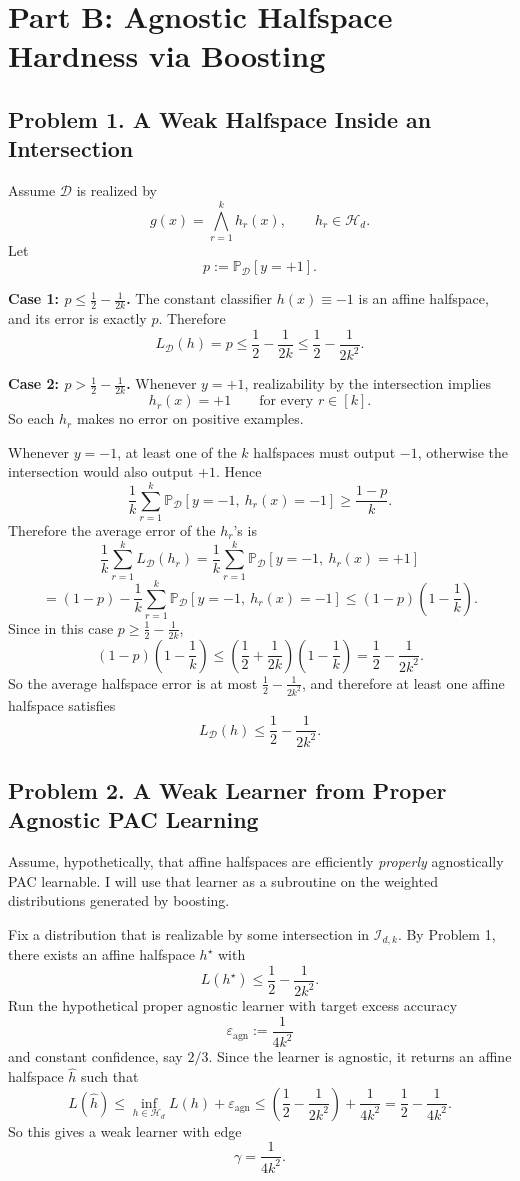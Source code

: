 \documentclass{article}
\newcommand{\PP}{\mathbb{P}}
\newcommand{\cD}{\mathcal{D}}
\newcommand{\cH}{\mathcal{H}}
\newcommand{\cI}{\mathcal{I}}
\begin{document}
\newpage
\section{Part B: Agnostic Halfspace Hardness via Boosting}

\subsection{Problem 1. A Weak Halfspace Inside an Intersection}

Assume $\cD$ is realized by
$$
g(x)=\bigwedge_{r=1}^k h_r(x),
\qquad
h_r\in \cH_d.
$$
Let
$$
p := \PP_{\cD}[y=+1].
$$

\textbf{Case 1: $p \le \frac12-\frac{1}{2k}$.}
The constant classifier $h(x)\equiv -1$ is an affine halfspace, and its error is exactly $p$. Therefore
$$
L_{\cD}(h)=p \le \frac12-\frac{1}{2k} \le \frac12-\frac{1}{2k^2}.
$$

\textbf{Case 2: $p > \frac12-\frac{1}{2k}$.}
Whenever $y=+1$, realizability by the intersection implies
$$
h_r(x)=+1
\qquad
\text{for every }r\in[k].
$$
So each $h_r$ makes no error on positive examples.

Whenever $y=-1$, at least one of the $k$ halfspaces must output $-1$, otherwise the intersection would also output $+1$. Hence
$$
\frac{1}{k}\sum_{r=1}^k \PP_{\cD}[y=-1,\ h_r(x)=-1]
\ge
\frac{1-p}{k}.
$$
Therefore the average error of the $h_r$'s is
$$
\frac1k\sum_{r=1}^k L_{\cD}(h_r)
=
\frac1k\sum_{r=1}^k \PP_{\cD}[y=-1,\ h_r(x)=+1]
$$
$$
=
(1-p) - \frac1k\sum_{r=1}^k \PP_{\cD}[y=-1,\ h_r(x)=-1]
\le
(1-p)\left(1-\frac1k\right).
$$
Since in this case $p\ge \frac12-\frac{1}{2k}$,
$$
(1-p)\left(1-\frac1k\right)
\le
\left(\frac12+\frac{1}{2k}\right)\left(1-\frac1k\right)
=
\frac12-\frac{1}{2k^2}.
$$
So the average halfspace error is at most $\frac12-\frac{1}{2k^2}$, and therefore at least one affine halfspace satisfies
$$
L_{\cD}(h)
\le
\frac12-\frac{1}{2k^2}.
$$

\subsection{Problem 2. A Weak Learner from Proper Agnostic PAC Learning}

Assume, hypothetically, that affine halfspaces are efficiently \emph{properly} agnostically PAC learnable. I will use that learner as a subroutine on the weighted distributions generated by boosting.

Fix a distribution that is realizable by some intersection in $\cI_{d,k}$. By Problem 1, there exists an affine halfspace $h^\star$ with
$$
L(h^\star)\le \frac12-\frac{1}{2k^2}.
$$
Run the hypothetical proper agnostic learner with target excess accuracy
$$
\varepsilon_{\mathrm{agn}} := \frac{1}{4k^2}
$$
and constant confidence, say $2/3$. Since the learner is agnostic, it returns an affine halfspace $\widehat{h}$ such that
$$
L(\widehat{h})
\le
\inf_{h\in\cH_d} L(h) + \varepsilon_{\mathrm{agn}}
\le
\left(\frac12-\frac{1}{2k^2}\right)+\frac{1}{4k^2}
=
\frac12-\frac{1}{4k^2}.
$$
So this gives a weak learner with edge
$$
\gamma = \frac{1}{4k^2}.
$$
\end{document}
